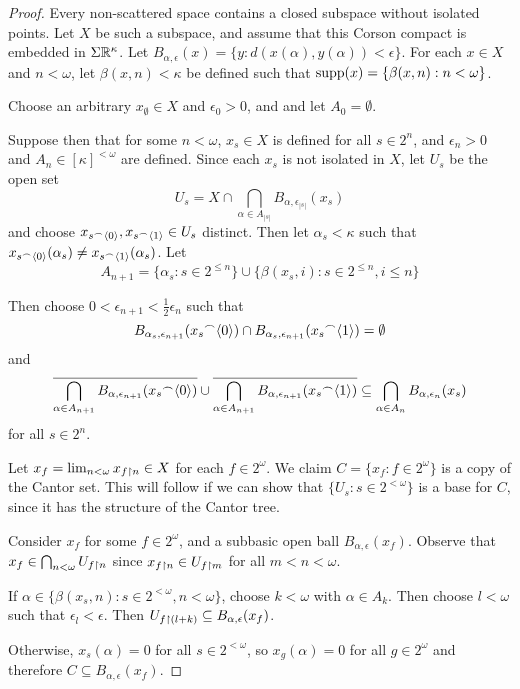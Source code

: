 \documentclass{amsart}
\theoremstyle{definition}
\begin{document}
  \begin{proof}
    Every non-scattered space contains a closed subspace without
    isolated points. Let \(X\) be such a subspace, and assume that this
    Corson compact is embedded in \(\Sigma\mathbb{R}^{\kappa}\). Let
    \(B_{\alpha,\epsilon}(x)=\{y: d(x(\alpha),y(\alpha))<\epsilon\}\).
    For each \(x\in X\) and \(n<\omega\), let \(\beta(x,n)<\kappa\) be defined
    such that
    \(\textrm{supp}(x)=\{\beta(x,n):n<\omega\}\).

    Choose an arbitrary \(x_\emptyset\in X\) and \(\epsilon_0>0\), and
    and let \(A_0=\emptyset\).

    Suppose then that for some \(n<\omega\),
    \(x_s\in X\) is defined for all \(s\in 2^n\),
    and \(\epsilon_n>0\) and \(A_n\in[\kappa]^{<\omega}\) are defined.
    Since each \(x_s\) is not isolated in \(X\), let \(U_s\) be the open
    set
      \[
        U_s
          =
        X
          \cap
        \bigcap_{\alpha\in A_{|s|}} B_{\alpha,\epsilon_{|s|}}(x_s)
      \]
    and choose \(x_{s{^\frown}\langle0\rangle},x_{s{^\frown}\langle1\rangle}\in U_s\) distinct.
    Then let \(\alpha_s<\kappa\) such that
    \(x_{s{^\frown}\langle0\rangle}(\alpha_s)\not=x_{s{^\frown}\langle1\rangle}(\alpha_s)\).
    Let
      \[
        A_{n+1}
          =
        \{\alpha_s:s\in2^{\leq n}\}
          \cup
        \{\beta(x_s,i):s\in2^{\leq n},i\leq n\}
      \]

    Then choose \(0<\epsilon_{n+1}<\frac{1}{2}\epsilon_n\) such that
    \[
      B_{\alpha_s,\epsilon_{n+1}}(x_s{^\frown}\langle0\rangle)
        \cap
      B_{\alpha_s,\epsilon_{n+1}}(x_s{^\frown}\langle1\rangle)
        =
      \emptyset
    \]
    and
    \[
      \overline{
        \bigcap_{\alpha\in A_{n+1}}
        B_{\alpha,\epsilon_{n+1}}(x_s{^\frown}\langle0\rangle)
      }
        \cup
      \overline{
        \bigcap_{\alpha\in A_{n+1}}
        B_{\alpha,\epsilon_{n+1}}(x_s{^\frown}\langle1\rangle)
      }
        \subseteq
      \bigcap_{\alpha\in A_n} B_{\alpha,\epsilon_n}(x_s)
    \]
    for all \(s\in 2^n\).

    Let \(x_f=\lim_{n<\omega} x_{f\restriction n}\in X\)
    for each \(f\in 2^\omega\). We claim \(C=\{x_f:f\in 2^\omega\}\)
    is a copy of the Cantor set. This will follow if we can show that
    \(\{U_s:s\in 2^{<\omega}\}\) is a base for \(C\), since it has
    the structure of the Cantor tree.

    Consider \(x_f\) for some \(f\in 2^\omega\), and a subbasic open ball
    \(B_{\alpha,\epsilon}(x_f)\). Observe that
    \(x_f\in\bigcap_{n<\omega} U_{f\restriction n}\) since
    \(x_{f\restriction n}\in U_{f\restriction m}\) for all \(m<n<\omega\).

    If \(\alpha\in\{\beta(x_s,n):s\in2^{<\omega},n<\omega\}\), choose
    \(k<\omega\) with \(\alpha\in A_k\). Then choose \(l<\omega\) such that
    \(\epsilon_l<\epsilon\). Then
    \(U_{f\restriction(l+k)}\subseteq B_{\alpha,\epsilon}(x_f)\).

    Otherwise, \(x_s(\alpha)=0\) for all \(s\in2^{<\omega}\), so
    \(x_g(\alpha)=0\) for all \(g\in2^\omega\) and therefore
    \(C\subseteq B_{\alpha,\epsilon}(x_f)\).
  \end{proof}
\end{document}
